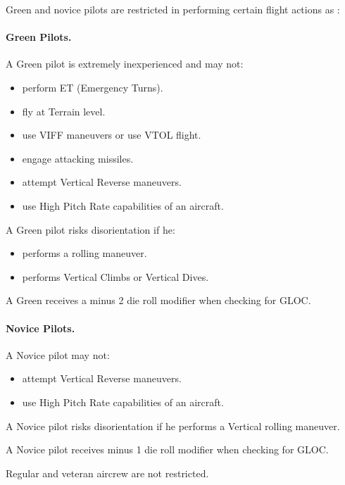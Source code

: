 \begin{advancedrules}
{Green and novice pilots are restricted in performing certain flight actions as :

\paragraph{Green Pilots.} A Green pilot is extremely inexperienced and may not:
\begin{itemize}
    \item perform ET (Emergency Turns).
    \item fly at Terrain level.
    \item use VIFF maneuvers or use VTOL flight.
    \item engage attacking missiles.
    \item attempt Vertical Reverse maneuvers.
    \item use High Pitch Rate capabilities of an aircraft. 
\end{itemize}

A Green pilot risks disorientation if he:
\begin{itemize}
    \item performs a rolling maneuver.
    \item performs Vertical Climbs or Vertical Dives.
\end{itemize}

A Green  receives a minus 2 die roll modifier when checking for GLOC.

\paragraph{Novice Pilots.} A Novice pilot may not:

\begin{itemize}
    \item attempt Vertical Reverse maneuvers.
    \item use High Pitch Rate capabilities of an aircraft.
\end{itemize}

A Novice pilot risks disorientation if he performs a Vertical rolling maneuver.

A Novice pilot receives minus 1 die roll modifier when checking for GLOC.

Regular and veteran aircrew are not restricted.

}
\end{advancedrules}
